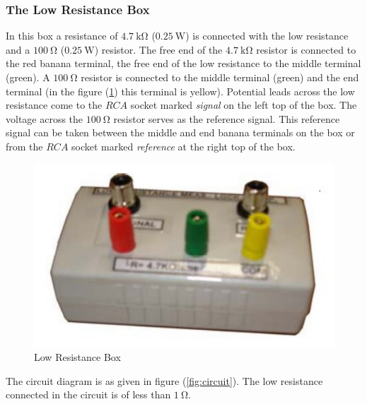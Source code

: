 \documentclass[%
 reprint,
nofootinbib,
 amsmath,amssymb,
 aps,
]{revtex4-2}
\begin{document}
        \subsubsection{The Low Resistance Box}
            In this box a resistance of $\SI{4.7}{\kilo \ohm}$ ($\SI{0.25}{\watt}$) is connected with the low resistance and a $\SI{100}{\ohm}$ ($\SI{0.25}{\watt}$) resistor. The free end of the $\SI{4.7}{\kilo \ohm}$ resistor is connected to the red banana terminal, the free end of the low resistance to the middle terminal (green). A $\SI{100}{\ohm}$ resistor is connected to the middle terminal (green) and the end terminal (in the figure (\ref{fig:resbox}) this terminal is yellow). Potential leads across the low resistance come to the $RCA$ socket marked \textit{signal} on the left top of the box. The voltage across the $\SI{100}{\ohm}$ resistor serves as the reference signal. This reference signal can be taken between the middle and end banana terminals on the box or from the $RCA$ socket marked \textit{reference} at the right top of the box. 
            \begin{figure}
                \centering
                \includegraphics[scale = 0.7]{Figures/lowresbox.png}
                \caption{Low Resistance Box}
                \label{fig:resbox}
            \end{figure}
            \par
            The circuit diagram is as given in figure (\ref{fig:circuit}). The low resistance connected in the circuit is of less than $\SI{1}{\ohm}$.
\end{document}
